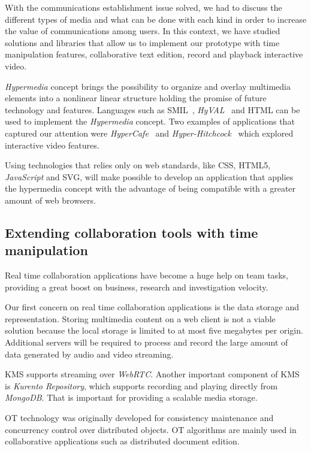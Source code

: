 \documentclass[conference,compsoc,a4paper]{IEEEtran}
\begin{document}
With the communications establishment issue solved, we had to discuss the different types of media and what can be done with each kind in order to increase the value of communications among users. In this context, we have studied solutions and libraries that allow us to implement our prototype with time manipulation features, collaborative text edition, record and playback interactive video. 

	\emph{Hypermedia} concept brings the possibility to organize and overlay multimedia elements into a nonlinear linear structure holding the promise of future technology and features. Languages such as \gls{SMIL}~\cite{hyval}, \emph{HyVAL}~\cite{hyval} and \gls{HTML} can be used to implement the \emph{Hypermedia} concept. Two examples of applications that captured our attention were \emph{HyperCafe}~\cite{hypercafe} and \emph{Hyper-Hitchcock}~\cite{hitchcock} which explored interactive video features.

  Using technologies that relies only on web standards, like \gls{CSS}, \gls{HTML}5, \emph{JavaScript} and \gls{SVG}, will make possible to develop an application that applies the hypermedia concept with the advantage of being compatible with a greater amount of web browsers.
  
\subsection{Extending collaboration tools with time manipulation}
\label{collab}

Real time collaboration applications have become a huge help on team tasks, providing a great boost on business, research and investigation velocity.

 Our first concern on real time collaboration applications is the data storage and representation. Storing multimedia content on a web client is not a viable solution because the local storage is limited to at most five megabytes per origin. Additional servers will be required to process and record the large amount of data generated by audio and video streaming.
 
\gls{KMS} supports streaming over \emph{WebRTC}. Another important component of \gls{KMS} is \emph{Kurento Repository}, which supports recording and playing directly from \emph{MongoDB}. That is important for providing a scalable media storage. 
	
     \gls{OT} technology was originally developed for consistency maintenance and concurrency control over distributed objects.
     \gls{OT} algorithms are mainly used in collaborative applications such as distributed document edition.
\end{document}
